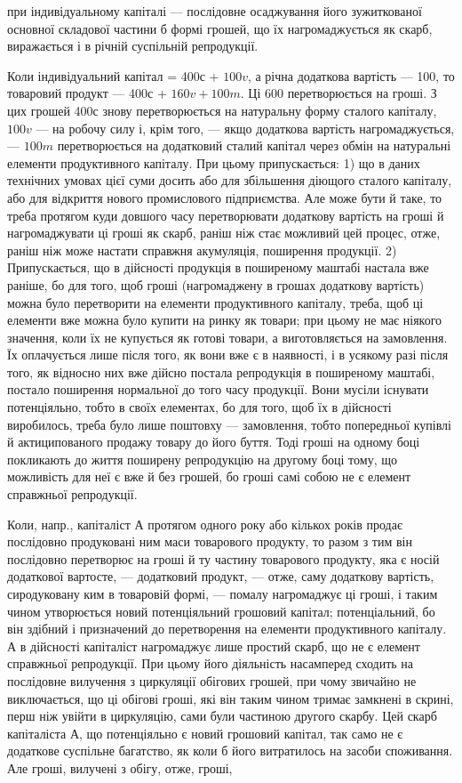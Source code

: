 \parcont{}  %
при індивідуальному капіталі — послідовне осаджування його зужиткованої основної складової частини б
формі грошей, що їх нагромаджується як скарб, виражається і в річній суспільній репродукції.

Коли індивідуальний капітал = 400с + $100v$, а річна додаткова вартість — 100, то товаровий продукт —
400с + $160v + 100m$. Ці 600 перетворюється на гроші. З цих грошей 400с знову перетворюється на
натуральну форму сталого капіталу, $100v$ — на робочу силу і, крім того, — якщо додаткова вартість
нагромаджується, — $100m$ перетворюється на додатковий сталий капітал через обмін на натуральні
елементи продуктивного капіталу. При цьому припускається: 1) що в даних технічних умовах цієї суми
досить або для збільшення діющого сталого капіталу, або для відкриття нового промислового
підприємства. Але може бути й таке, то треба протягом куди довшого часу перетворювати додаткову
вартість на гроші й нагромаджувати ці гроші як скарб, раніш ніж стає можливий цей процес, отже,
раніш ніж може настати справжня акумуляція, поширення продукції. 2) Припускається, що в дійсності
продукція в поширеному маштабі настала вже раніше, бо для того, щоб гроші (нагромаджену в грошах
додаткову вартість) можна було перетворити на елементи продуктивного капіталу, треба, щоб ці
елементи вже можна було купити на ринку як товари; при цьому не має ніякого значення, коли їх не
купується як готові товари, а виготовляється на замовлення. Їх оплачується лише після того, як вони
вже є в наявності, і в усякому разі після того, як відносно них вже дійсно постала репродукція в
поширеному маштабі, постало поширення нормальної до того часу продукції. Вони мусіли існувати
потенціяльно, тобто в своїх елементах, бо для того, щоб їх в дійсності виробилось, треба було лише
поштовху — замовлення, тобто попередньої купівлі й актиципованого продажу товару до його буття. Тоді
гроші на одному боці покликають до життя поширену репродукцію на другому боці тому, що можливість
для неї є вже й без грошей, бо гроші самі собою не є елемент справжньої репродукції.

Коли, напр., капіталіст А протягом одного року або кількох років продає послідовно продуковані ним
маси товарового продукту, то разом з тим він послідовно перетворює на гроші й ту частину товарового
продукту, яка є носій додаткової вартосте, — додатковий продукт, — отже, саму додаткову вартість,
сиродуковану ким в товаровій формі, — помалу нагромаджує ці гроші, і таким чином утворюється новий
потенціяльний грошовий капітал; потенціальний, бо він здібний і призначений до перетворення на
елементи продуктивного капіталу. А в дійсності капіталіст нагромаджує лише простий скарб, що не є
елемент справжньої репродукції. При цьому його діяльність насамперед сходить на послідовне вилучення
з циркуляції обігових грошей, при чому звичайно не виключається, що ці обігові гроші, які він таким
чином тримає замкнені в скрині, перш ніж увійти в циркуляцію, сами були частиною другого скарбу. Цей
скарб капіталіста А, що потенціяльно є новий грошовий капітал, так само не є додаткове суспільне
багатство, як коли б його витратилось на засоби споживання. Але гроші, вилучені з обігу, отже,
гроші,
\parbreak{}  %
